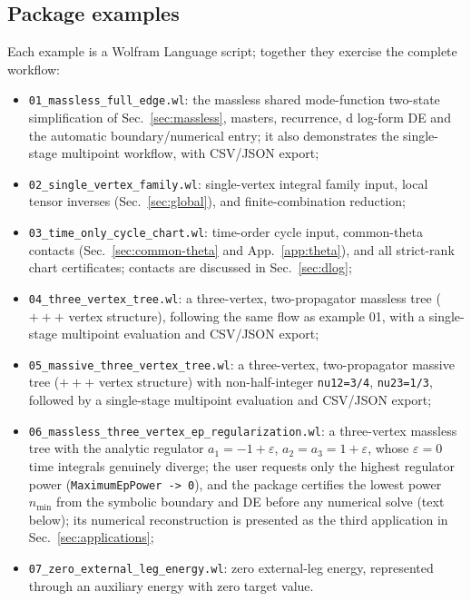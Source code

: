 \documentclass[11pt,a4paper]{article}
\begin{document}
\subsection{Package examples}
\label{sec:examples}
Each example is a Wolfram Language script; together they exercise the complete workflow:
\begin{itemize}
  \item \texttt{01\_massless\_full\_edge.wl}: the massless shared mode-function two-state simplification of
        Sec.~\ref{sec:massless}, masters, recurrence, d log-form DE and the automatic
        boundary/numerical entry; it also demonstrates the
        single-stage multipoint workflow, with CSV/JSON export;
  \item \texttt{02\_single\_vertex\_family.wl}: single-vertex integral family input, local tensor
        inverses (Sec.~\ref{sec:global}), and finite-combination reduction;
  \item \texttt{03\_time\_only\_cycle\_chart.wl}: time-order cycle input, common-theta contacts
        (Sec.~\ref{sec:common-theta} and App.~\ref{app:theta}), and
        all strict-rank chart certificates; contacts are discussed in Sec.~\ref{sec:dlog};
  \item \texttt{04\_three\_vertex\_tree.wl}: a three-vertex, two-propagator massless tree
        ($+++$ vertex structure), following the same flow as example 01, with a single-stage
        multipoint evaluation and CSV/JSON export;
  \item \texttt{05\_massive\_three\_vertex\_tree.wl}: a three-vertex, two-propagator massive tree
        ($+++$ vertex structure) with non-half-integer \texttt{nu12=3/4}, \texttt{nu23=1/3},
        followed by a single-stage multipoint evaluation and CSV/JSON export;
  \item \texttt{06\_massless\_three\_vertex\_ep\_regularization.wl}: a three-vertex massless tree
        with the analytic regulator $a_1=-1+\varepsilon$, $a_2=a_3=1+\varepsilon$, whose
        $\varepsilon=0$ time integrals genuinely diverge; the user requests
        only the highest regulator power (\texttt{MaximumEpPower -> 0}), and the package
        certifies the lowest power $n_{\min}$ from the symbolic boundary and DE before any
        numerical solve (text below); its numerical
        reconstruction is presented as the third application in Sec.~\ref{sec:applications};
  \item \texttt{07\_zero\_external\_leg\_energy.wl}: zero external-leg energy, represented through an auxiliary energy with zero target value.
\end{itemize}
\end{document}
